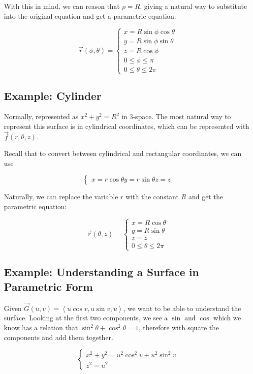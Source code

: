 \documentclass{article}
\begin{document}
With this in mind, we can reason that $\rho=R$, giving a natural way to substitute into the original equation and get a parametric equation:

\[
\vec{r}(\phi, \theta) = \begin{cases}
  x = R \sin{\phi} \cos{\theta} \\
  y = R \sin{\phi} \sin{\theta} \\
  z = R \cos{\phi} \\
  0 \le \phi \le \pi \\
  0 \le \theta \le 2 \pi
\end{cases}
\]

\subsection*{Example: Cylinder}

Normally, represented as $x^2+y^2=R^2$ in $3$-space. The most natural way to represent this surface is in cylindrical coordinates, which can be represented with $\vec{f}(r, \theta, z)$.

Recall that to convert between cylindrical and rectangular coordinates, we can use

\[
\begin{cases}
  x = r \cos{\theta}
  y = r \sin{\theta}
  z = z
\end{cases}
\]

Naturally, we can replace the variable $r$ with the constant $R$ and get the parametric equation:

\[
\vec{r}(\theta, z) = \begin{cases}
  x = R \cos{\theta} \\
  y = R \sin{\theta} \\
  z = z \\
  0 \le \theta \le 2 \pi
\end{cases}
\]

\subsection*{Example: Understanding a Surface in Parametric Form}

Given $\vec{G}(u,v) = \left<u \cos{v}, u \sin{v}, u\right>$, we want to be able to understand the surface. Looking at the first two components, we see a $\sin$ and $\cos$ which we know has a relation that $\sin^2 \theta + \cos^2 \theta = 1$, therefore with square the components and add them together.

\[
\begin{cases}
  x^2+y^2 = u^2 \cos^2 v + u^2 \sin^2 v \\
  z^2 = u^2
\end{cases}
\]
\end{document}
